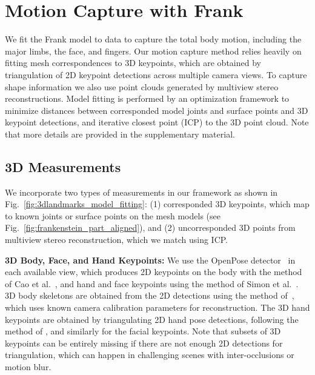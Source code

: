 

\section{Motion Capture with Frank}

We fit the Frank model to data to capture the total body motion, including the major limbs, the face, and fingers. Our motion capture method relies heavily on fitting mesh correspondences to 3D keypoints, which are obtained by triangulation of 2D keypoint detections across multiple camera views. To capture shape information we also use point clouds generated by multiview stereo reconstructions. Model fitting is performed by an optimization framework to minimize distances between corresponded model joints and surface points and 3D keypoint detections, and iterative closest point (ICP) to the 3D point cloud. Note that more details are provided in the supplementary material.

\subsection{3D Measurements}
\label{subsection:landmark_reconstruction}
We incorporate two types of measurements in our framework as shown in Fig.~\ref{fig:3dlandmarks_model_fitting}: (1) corresponded 3D keypoints, which map to known joints or surface points on the mesh models (see Fig.~\ref{fig:frankenstein_part_aligned}), and (2) uncorresponded 3D points from multiview stereo reconstruction, which we match using ICP. 


\textbf{3D Body, Face, and Hand Keypoints:}  We use the OpenPose detector~\cite{openpose} in each available view, which produces 2D keypoints on the body with the method of Cao et al.~\cite{cao2016realtime}, and hand and face keypoints using the method of Simon et al.~\cite{simon2017hand}. 3D body skeletons are obtained from the 2D detections using the method of~\cite{joo2017panoptic}, which uses known camera calibration parameters for reconstruction. The 3D hand keypoints are obtained by triangulating 2D hand pose detections, following the method of \cite{simon2017hand}, and similarly for the facial keypoints. Note that subsets of 3D keypoints can be entirely missing if there are not enough 2D detections for triangulation, which can happen in challenging scenes with inter-occlusions or motion blur. 


